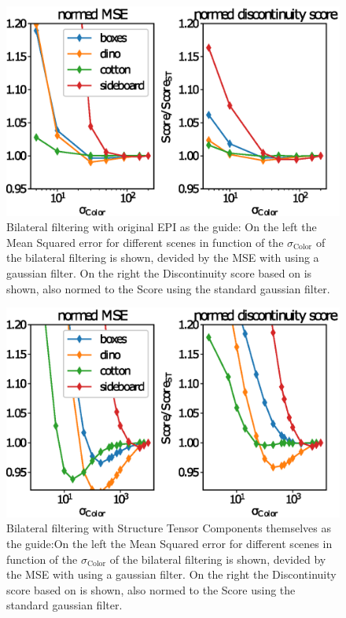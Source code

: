 \documentclass  [
  paper    = a4,
  BCOR     = 10mm,
  twoside,
  fontsize = 12pt,
  fleqn,
  toc      = bibnumbered,
  toc      = listofnumbered,
  numbers  = noendperiod,
  headings = normal,
  listof   = leveldown,
  version  = 3.03
]                                       {scrreprt}
\begin{document}
\begin{figure}
	\centering
	\includegraphics[width=0.7\linewidth]{images/bilateral_params}
	\caption[Parameter dependency for bilateral filtering using EPI]{Bilateral filtering with original EPI as the guide: On the left the Mean Squared error for different scenes in function of the $\sigma_\text{Color}$ of the bilateral filtering is shown, devided by the MSE with using a gaussian filter. On the right the Discontinuity score based on \cite{honauer2016benchmark} is shown, also normed to the Score using the standard gaussian filter.}
	\label{fig:bilateralparams}
\end{figure}
\begin{figure}
	\centering
	\includegraphics[width=0.7\linewidth]{images/bilateral_norm_params}
	\caption[Parameter dependency for bilateral filtering]{Bilateral filtering with Structure Tensor Components themselves as the guide:On the left the Mean Squared error for different scenes in function of the $\sigma_\text{Color}$ of the bilateral filtering is shown, devided by the MSE with using a gaussian filter. On the right the Discontinuity score based on \cite{honauer2016benchmark} is shown, also normed to the Score using the standard gaussian filter.}
	\label{fig:bilateralnormparams}
\end{figure}
\end{document}
